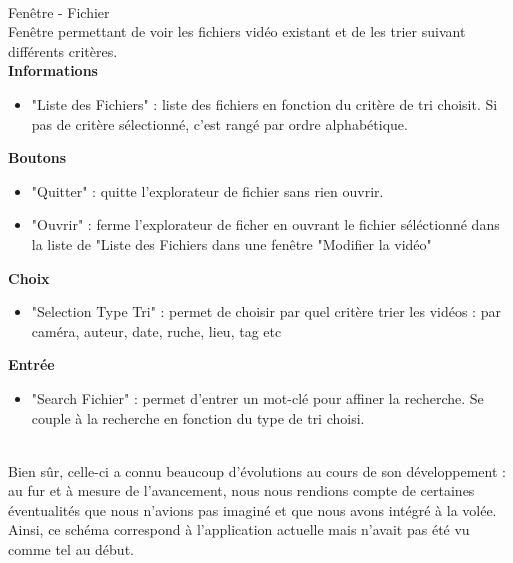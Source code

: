 \documentclass[11pt,french,a4paper]{report}
\begin{document}
\dotfill \\

\Large Fenêtre - Fichier\normalsize \\
    Fenêtre permettant de voir les fichiers vidéo existant et de les trier suivant différents critères. \\
\large \textbf{Informations}\normalsize 
    \begin{itemize}[label=, leftmargin=*,parsep=0cm,itemsep=0cm,topsep=0cm]
        \item "Liste des Fichiers" : liste des fichiers en fonction du critère de tri choisit. Si pas de critère sélectionné,
        c'est rangé par ordre alphabétique.
    \end{itemize}
\large \textbf{Boutons}\normalsize
    \begin{itemize}[label=, leftmargin=*,parsep=0cm,itemsep=0cm,topsep=0cm]
        \item "Quitter" : quitte l'explorateur de fichier sans rien ouvrir.
        \item "Ouvrir" : ferme l'explorateur de ficher en ouvrant le fichier séléctionné dans la liste de "Liste des Fichiers dans une
        fenêtre "Modifier la vidéo"
    \end{itemize}
\large \textbf{Choix}\normalsize
    \begin{itemize}[label=, leftmargin=*,parsep=0cm,itemsep=0cm,topsep=0cm]
        \item "Selection Type Tri" : permet de choisir par quel critère trier les vidéos : par caméra, auteur, date, ruche, lieu, tag etc
    \end{itemize}
\large \textbf{Entrée}\normalsize
    \begin{itemize}[label=, leftmargin=*,parsep=0cm,itemsep=0cm,topsep=0cm]
        \item "Search Fichier" : permet d'entrer un mot-clé pour affiner la recherche. Se couple à la recherche en fonction du type de tri
        choisi.
    \end{itemize}
\dotfill \\
Bien sûr, celle-ci a connu beaucoup d'évolutions au cours de son développement : au fur et à mesure de l'avancement,
nous nous rendions compte de certaines éventualités que nous n'avions pas imaginé et que nous avons intégré à la volée. 
Ainsi, ce schéma correspond à l'application actuelle mais n'avait pas été vu comme tel au début. 
\end{document}
